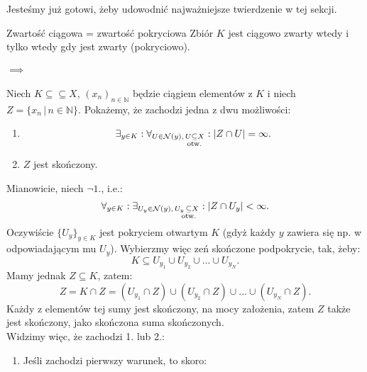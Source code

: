 \documentclass{article}
\numberwithin{defi}{section}
\numberwithin{defi}{section}
\newcommand{\N}{\mathbb{N}}
\newcommand{\oo}{\infty}
\newcommand{\Nau}{\mathcal{N}}
\newcommand{\subotw}{\underset{\clap{\scriptsize otw.}}{\subseteq}}
\newcommand{\ciag}[1]{(#1_{n})_{n \in \N}}
\begin{document}
    Jesteśmy już gotowi, żeby udowodnić najważniejsze twierdzenie w tej sekcji.

    \begin{twier}{Zwartość ciągowa = zwartość pokryciowa}
        Zbiór $K$ jest ciągowo zwarty wtedy i tylko wtedy gdy jest zwarty (pokryciowo).
    \end{twier}






    \begin{dow}
        \paragraph{$\implies$} Niech $K \subseteq \subseteq X$, $\ciag{x}$ będzie ciągiem elementów z $K$ i niech $Z  = \{ x_n \, | \, n \in \N \}$. Pokażemy, że zachodzi jedna z dwu możliwości: \begin{enumerate}
            \item \begin{equation*}
                \exists_{y \in K}: \forall_{U \in \Nau(y), \, U \subotw X}: | Z \cap U | = \oo. 
            \end{equation*}
            \item $Z$ jest skończony.
        \end{enumerate}  
        Mianowicie, niech $\neg 1.$, i.e.: \begin{equation*}
            \forall_{y \in K}: \exists_{U_y \in \Nau(y), \, U_y \, \subotw X}: | Z \cap U_y | < \oo.
        \end{equation*} Oczywiście $\{ U_y \}_{y \in K}$ jest pokryciem otwartym $K$ (gdyż każdy $y$ zawiera się np. w odpowiadającym mu $U_y$). Wybierzmy więc zeń skończone podpokrycie, tak, żeby: \begin{equation*}
            K \subseteq U_{y_1} \cup U_{y_2} \cup ... \cup U_{y_N}. 
        \end{equation*} Mamy jednak $Z \subseteq K$, zatem: \begin{equation}
            Z = K \cap Z = (U_{y_1} \cap Z) \cup (U_{y_2} \cap Z) \cup ... \cup (U_{y_N} \cap Z).
        \end{equation} Każdy z elementów tej sumy jest skończony, na mocy założenia, zatem $Z$ także jest skończony, jako skończona suma skończonych. \\
        Widzimy więc, że zachodzi 1. lub 2.: \begin{enumerate}
            \item Jeśli zachodzi pierwszy warunek, to skoro: \begin{equation*}

\end{equation*}
\end{enumerate}
\end{dow}
\end{document}
